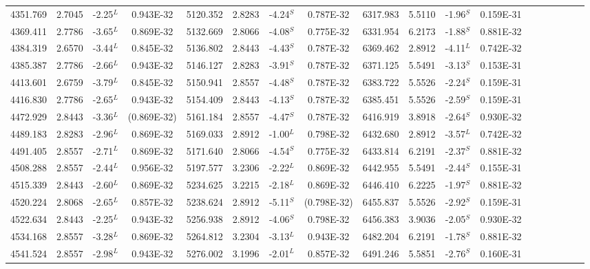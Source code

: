 \documentclass[traditabstract]{aa} %
\begin{document}
\begin{table}
\begin{minipage}[t]{\textwidth}
\begin{tabular}{cccccccccccccccccc}
 4351.769 & 2.7045 &-2.25$^L$ & 0.943E-32  & 5120.352 & 2.8283 &-4.24$^S$ & 0.787E-32  & 6317.983 & 5.5110 &-1.96$^S$ & 0.159E-31  \\ 
 4369.411 & 2.7786 &-3.65$^L$ & 0.869E-32  & 5132.669 & 2.8066 &-4.08$^S$ & 0.775E-32  & 6331.954 & 6.2173 &-1.88$^S$ & 0.881E-32  \\ 
 4384.319 & 2.6570 &-3.44$^L$ & 0.845E-32  & 5136.802 & 2.8443 &-4.43$^S$ & 0.787E-32  & 6369.462 & 2.8912 &-4.11$^L$ & 0.742E-32  \\ 
 4385.387 & 2.7786 &-2.66$^L$ & 0.943E-32  & 5146.127 & 2.8283 &-3.91$^S$ & 0.787E-32  & 6371.125 & 5.5491 &-3.13$^S$ & 0.153E-31  \\ 
 4413.601 & 2.6759 &-3.79$^L$ & 0.845E-32  & 5150.941 & 2.8557 &-4.48$^S$ & 0.787E-32  & 6383.722 & 5.5526 &-2.24$^S$ & 0.159E-31  \\ 
 4416.830 & 2.7786 &-2.65$^L$ & 0.943E-32  & 5154.409 & 2.8443 &-4.13$^S$ & 0.787E-32  & 6385.451 & 5.5526 &-2.59$^S$ & 0.159E-31  \\ 
 4472.929 & 2.8443 &-3.36$^L$ & (0.869E-32)& 5161.184 & 2.8557 &-4.47$^S$ & 0.787E-32  & 6416.919 & 3.8918 &-2.64$^S$ & 0.930E-32  \\ 
 4489.183 & 2.8283 &-2.96$^L$ & 0.869E-32  & 5169.033 & 2.8912 &-1.00$^L$ & 0.798E-32  & 6432.680 & 2.8912 &-3.57$^L$ & 0.742E-32  \\ 
 4491.405 & 2.8557 &-2.71$^L$ & 0.869E-32  & 5171.640 & 2.8066 &-4.54$^S$ & 0.775E-32  & 6433.814 & 6.2191 &-2.37$^S$ & 0.881E-32  \\ 
 4508.288 & 2.8557 &-2.44$^L$ & 0.956E-32  & 5197.577 & 3.2306 &-2.22$^L$ & 0.869E-32  & 6442.955 & 5.5491 &-2.44$^S$ & 0.155E-31  \\ 
 4515.339 & 2.8443 &-2.60$^L$ & 0.869E-32  & 5234.625 & 3.2215 &-2.18$^L$ & 0.869E-32  & 6446.410 & 6.2225 &-1.97$^S$ & 0.881E-32  \\ 
 4520.224 & 2.8068 &-2.65$^L$ & 0.857E-32  & 5238.624 & 2.8912 &-5.11$^S$ & (0.798E-32)& 6455.837 & 5.5526 &-2.92$^S$ & 0.159E-31  \\   
 4522.634 & 2.8443 &-2.25$^L$ & 0.943E-32  & 5256.938 & 2.8912 &-4.06$^S$ & 0.798E-32  & 6456.383 & 3.9036 &-2.05$^S$ & 0.930E-32  \\   
 4534.168 & 2.8557 &-3.28$^L$ & 0.869E-32  & 5264.812 & 3.2304 &-3.13$^L$ & 0.943E-32  & 6482.204 & 6.2191 &-1.78$^S$ & 0.881E-32  \\   
 4541.524 & 2.8557 &-2.98$^L$ & 0.943E-32  & 5276.002 & 3.1996 &-2.01$^L$ & 0.857E-32  & 6491.246 & 5.5851 &-2.76$^S$ & 0.160E-31  \\   

\end{tabular}
\end{minipage}
\end{table}
\end{document}
